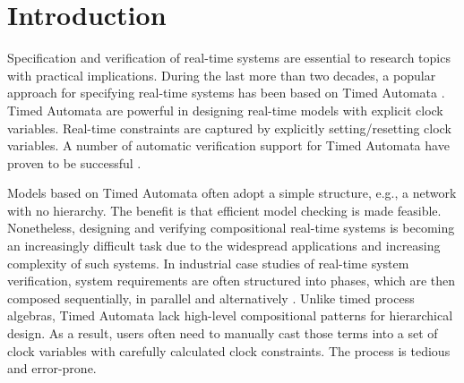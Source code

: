 \documentclass[acmsmall,10pt,review]{acmart}
\begin{document}


  



\maketitle

\section{Introduction}
\label{Introduction}


Specification and verification of real-time systems are essential 
to research topics with practical implications. During the last 
more than two decades, a popular approach for specifying real-time systems has been 
based on Timed Automata \cite{DBLP:journals/tcs/AlurD94}. 
Timed Automata are powerful 
in designing real-time models with explicit clock variables. Real-time 
constraints are captured by explicitly setting/resetting clock variables. 
A number of automatic verification support for Timed Automata have proven 
to be successful \cite{DBLP:journals/tse/WangSWQ17,DBLP:journals/sttt/LarsenPY97,DBLP:journals/sttt/Yovine97,DBLP:conf/seke/WangWH05}.


Models based on Timed Automata often adopt a simple structure, e.g., a 
network with no hierarchy. The benefit is that 
efficient model checking is made feasible. Nonetheless, designing and 
verifying compositional real-time systems is becoming an increasingly 
difficult task due to the widespread applications and increasing complexity 
of such systems. In industrial case studies of real-time system verification, system 
requirements are often structured into phases, which are then composed 
sequentially, in parallel and alternatively \cite{DBLP:conf/emsoft/LarsenMNS05}. 
Unlike timed process algebras, Timed Automata lack high-level 
compositional patterns for hierarchical design. As a result, users often 
need to manually cast those terms into a set of clock variables with 
carefully calculated clock constraints. The process is tedious and error-prone.
\end{document}
